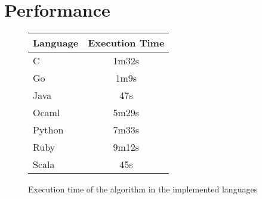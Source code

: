 \section{Performance}
\label{sec:Performance}
    \begin{figure}[H]
    \centering
    \begin{tabular}{|l|c|}
    \hline
    Language & Execution Time \\
    \hline
    C & 1m32s \\
    Go & 1m9s \\
    Java & 47s \\
    Ocaml & 5m29s \\
    Python & 7m33s \\
    Ruby & 9m12s \\
    Scala & 45s \\
    \hline
    \end{tabular}
    \caption{Execution time of the algorithm in the implemented languages}
    \label{fig:performance}
    \end{figure}